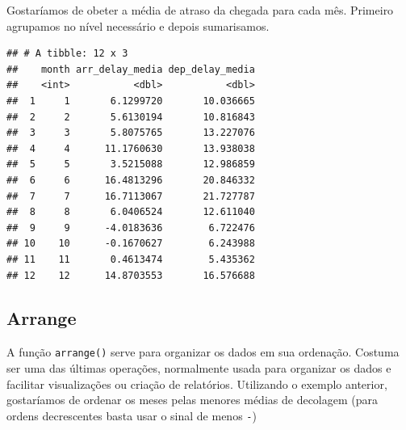 \documentclass[]{book}
\newenvironment{Shaded}{\begin{snugshade}}{\end{snugshade}}
\newcommand{\KeywordTok}[1]{\textcolor[rgb]{0.13,0.29,0.53}{\textbf{#1}}}
\newcommand{\DataTypeTok}[1]{\textcolor[rgb]{0.13,0.29,0.53}{#1}}
\newcommand{\StringTok}[1]{\textcolor[rgb]{0.31,0.60,0.02}{#1}}
\newcommand{\OtherTok}[1]{\textcolor[rgb]{0.56,0.35,0.01}{#1}}
\newcommand{\OperatorTok}[1]{\textcolor[rgb]{0.81,0.36,0.00}{\textbf{#1}}}
\newcommand{\NormalTok}[1]{#1}
\begin{document}
Gostaríamos de obeter a média de atraso da chegada para cada mês.
Primeiro agrupamos no nível necessário e depois sumarisamos.

\begin{Shaded}
\end{Shaded}

\begin{verbatim}
## # A tibble: 12 x 3
##    month arr_delay_media dep_delay_media
##    <int>           <dbl>           <dbl>
##  1     1       6.1299720       10.036665
##  2     2       5.6130194       10.816843
##  3     3       5.8075765       13.227076
##  4     4      11.1760630       13.938038
##  5     5       3.5215088       12.986859
##  6     6      16.4813296       20.846332
##  7     7      16.7113067       21.727787
##  8     8       6.0406524       12.611040
##  9     9      -4.0183636        6.722476
## 10    10      -0.1670627        6.243988
## 11    11       0.4613474        5.435362
## 12    12      14.8703553       16.576688
\end{verbatim}

\subsection{Arrange}\label{arrange}

A função \texttt{arrange()} serve para organizar os dados em sua
ordenação. Costuma ser uma das últimas operações, normalmente usada para
organizar os dados e facilitar visualizações ou criação de relatórios.
Utilizando o exemplo anterior, gostaríamos de ordenar os meses pelas
menores médias de decolagem (para ordens decrescentes basta usar o sinal
de menos \texttt{-})

\begin{Shaded}
\end{Shaded}
\end{document}
